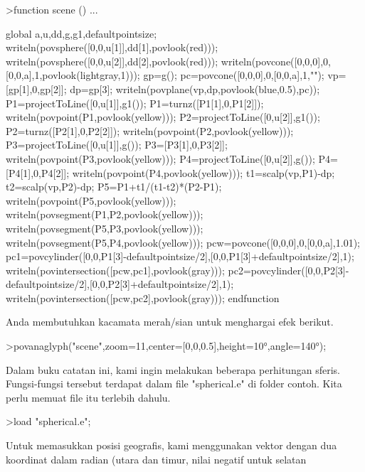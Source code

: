 \documentclass[a4paper,10pt]{article}
\begin{document}
\begin{eulernotebook}
\begin{eulercomment}
\begin{eulercomment}
\begin{eulerprompt}
>function scene () ...
\end{eulerprompt}
\begin{eulerudf}
  global a,u,dd,g,g1,defaultpointsize;
  writeln(povsphere([0,0,u[1]],dd[1],povlook(red)));
  writeln(povsphere([0,0,u[2]],dd[2],povlook(red)));
  writeln(povcone([0,0,0],0,[0,0,a],1,povlook(lightgray,1)));
  gp=g();
  pc=povcone([0,0,0],0,[0,0,a],1,"");
  vp=[gp[1],0,gp[2]]; dp=gp[3];
  writeln(povplane(vp,dp,povlook(blue,0.5),pc));
  P1=projectToLine([0,u[1]],g1()); P1=turnz([P1[1],0,P1[2]]);
  writeln(povpoint(P1,povlook(yellow)));
  P2=projectToLine([0,u[2]],g1()); P2=turnz([P2[1],0,P2[2]]);
  writeln(povpoint(P2,povlook(yellow)));
  P3=projectToLine([0,u[1]],g()); P3=[P3[1],0,P3[2]];
  writeln(povpoint(P3,povlook(yellow)));
  P4=projectToLine([0,u[2]],g()); P4=[P4[1],0,P4[2]];
  writeln(povpoint(P4,povlook(yellow)));
  t1=scalp(vp,P1)-dp; t2=scalp(vp,P2)-dp; P5=P1+t1/(t1-t2)*(P2-P1);
  writeln(povpoint(P5,povlook(yellow)));
  writeln(povsegment(P1,P2,povlook(yellow)));
  writeln(povsegment(P5,P3,povlook(yellow)));
  writeln(povsegment(P5,P4,povlook(yellow)));
  pcw=povcone([0,0,0],0,[0,0,a],1.01);
  pc1=povcylinder([0,0,P1[3]-defaultpointsize/2],[0,0,P1[3]+defaultpointsize/2],1);
  writeln(povintersection([pcw,pc1],povlook(gray)));
  pc2=povcylinder([0,0,P2[3]-defaultpointsize/2],[0,0,P2[3]+defaultpointsize/2],1);
  writeln(povintersection([pcw,pc2],povlook(gray)));
  endfunction
\end{eulerudf}
\begin{eulercomment}
Anda membutuhkan kacamata merah/sian untuk menghargai efek berikut.
\end{eulercomment}
\begin{eulerprompt}
>povanaglyph("scene",zoom=11,center=[0,0,0.5],height=10°,angle=140°);
\end{eulerprompt}
\begin{eulercomment}
Dalam buku catatan ini, kami ingin melakukan beberapa perhitungan
sferis. Fungsi-fungsi tersebut terdapat dalam file "spherical.e" di
folder contoh. Kita perlu memuat file itu terlebih dahulu.
\end{eulercomment}
\begin{eulerprompt}
>load "spherical.e";
\end{eulerprompt}
\begin{eulercomment}
Untuk memasukkan posisi geografis, kami menggunakan vektor dengan dua
koordinat dalam radian (utara dan timur, nilai negatif untuk selatan

\end{eulercomment}
\end{eulercomment}
\end{eulercomment}
\end{eulernotebook}
\end{document}

